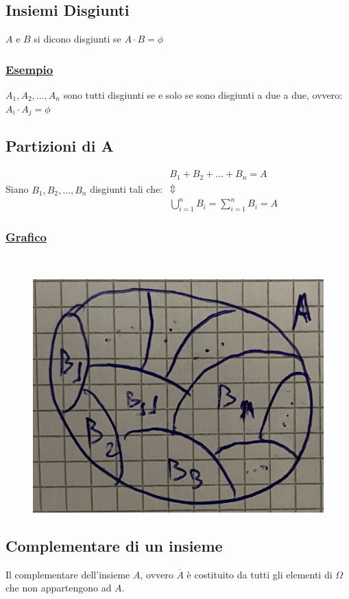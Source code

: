 \documentclass{article}
\begin{document}
\subsection{Insiemi Disgiunti}
$A$ e $B$ si dicono disgiunti se $A \cdot B = \phi$
\subsubsection{\underline{Esempio}}
$A_1,A_2, \dots , A_n $ sono tutti disgiunti se e solo se sono disgiunti a due a due, ovvero: $A_i \cdot A_j = \phi$

\subsection{Partizioni di A}
Siano $B_1,B_2, \dots, B_n$ disgiunti tali che: $\begin{matrix}
B_1 + B_2 + \dots + B_n = A \\
\Updownarrow \\
\bigcup\limits_{i=1}^{n} B_i = \sum\limits_{i=1}^{n} B_i= A
\end{matrix}$
\subsubsection{\underline{Grafico}} ~\\
\begin{figure}[ht]
\centering
\includegraphics[scale=0.13]{images/18.Partizione.jpeg}
\end{figure} 

\subsection{Complementare di un insieme}
Il complementare dell'insieme $A$, ovvero $\overline{A}$ è costituito da tutti gli elementi di $\Omega$ che non appartengono ad $A$.
\end{document}

